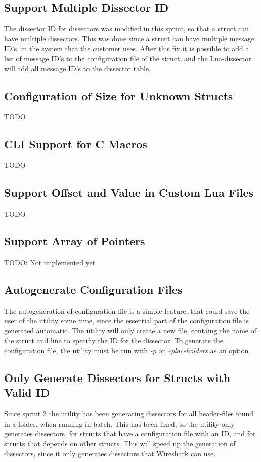 \subsection{Support Multiple Dissector ID }
The dissector ID for dissectors was modified in this sprint, so that a struct 
can have multiple dissectors. This was done since a struct can have multiple 
message ID's, in the system that the customer uses. After this fix it is 
possible to add a list of message ID's to the configuration file of the 
struct, and the Lua-dissector will add all message ID's to the dissector table.

\subsection{Configuration of Size for Unknown Structs}
TODO

\subsection{CLI Support for C Macros}
TODO

\subsection{Support Offset and Value in Custom Lua Files}
TODO

\subsection{Support Array of Pointers}


TODO: Not implemented yet

\subsection{Autogenerate Configuration Files}
The autogeneration of configuration file is a simple feature, that could save 
the user of the utility some time, since the essential part of the 
configuration file is generated automatic. The utility will only create a new 
file, containg the name of the struct and line to specifiy the ID for the 
dissector. To generate the configuration file, the utility must be run with 
\emph{-p} or \emph{--placeholders} as an option. 

\subsection{Only Generate Dissectors for Structs with Valid ID}
Since sprint 2 the utility has been generating dissectors for all header-files 
found in a folder, when running in batch. This has been fixed, so the utility 
only generates dissectors, for structs that have a configuration file with an 
ID, and for structs that depends on other structs. This will speed up the 
generation of dissectors, since it only generates dissectors that Wireshark 
can use.

